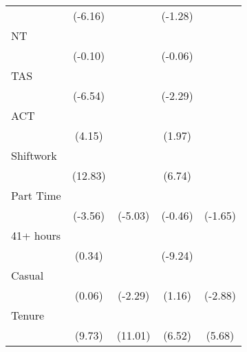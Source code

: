 {\begin{tabular}{l*{4}{c}}
                    &     (-6.16)         &                     &     (-1.28)         &                     \\
[1em]
NT                  &                     &                     &                     &                     \\
                    &     (-0.10)         &                     &     (-0.06)         &                     \\
[1em]
TAS                 &            \sym{***}&                     &            \sym{*}  &                     \\
                    &     (-6.54)         &                     &     (-2.29)         &                     \\
[1em]
ACT                 &            \sym{***}&                     &            \sym{*}  &                     \\
                    &      (4.15)         &                     &      (1.97)         &                     \\
[1em]
Shiftwork           &            \sym{***}&                     &            \sym{***}&                     \\
                    &     (12.83)         &                     &      (6.74)         &                     \\
[1em]
Part Time           &            \sym{***}&            \sym{***}&                     &                     \\
                    &     (-3.56)         &     (-5.03)         &     (-0.46)         &     (-1.65)         \\
[1em]
41+ hours           &                     &                     &            \sym{***}&                     \\
                    &      (0.34)         &                     &     (-9.24)         &                     \\
[1em]
Casual              &                     &            \sym{*}  &                     &            \sym{**} \\
                    &      (0.06)         &     (-2.29)         &      (1.16)         &     (-2.88)         \\
[1em]
Tenure              &            \sym{***}&            \sym{***}&            \sym{***}&            \sym{***}\\
                    &      (9.73)         &     (11.01)         &      (6.52)         &      (5.68)         \\

\end{tabular}}
